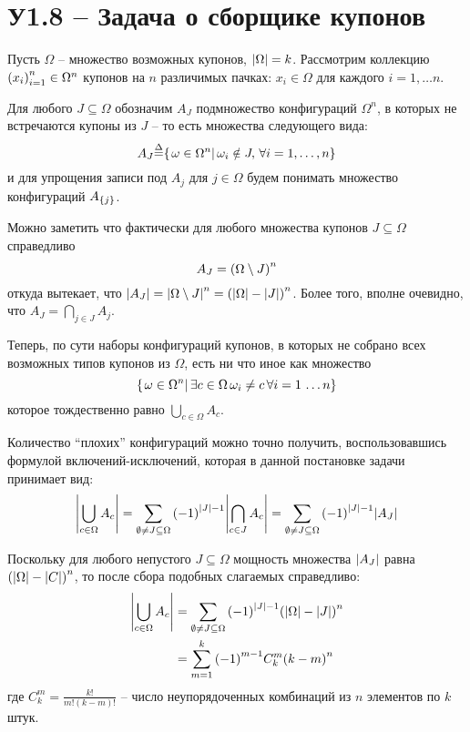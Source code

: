\documentclass[a4paper]{article}
\title{\rus{Домашняя работа по курсу \\ ``Теоретико-вероятностные методы в статистике''}}
\author{\rus{Назаров Иван,} \rus{101мНОД(ИССА)}}
\let\originalleft\left
\let\originalright\right
\renewcommand{\left}{\mathopen{}\mathclose\bgroup\originalleft}
\renewcommand{\right}{\aftergroup\egroup\originalright}
\newcommand{\obj}[1]{{\left\{ #1 \right \}}}
\newcommand{\brac}[1]{{\left ( #1 \right )}}
\newcommand{\induc}[1]{{\left . #1 \right \vert}}
\newcommand{\abs}[1]{{\left | #1 \right |}}
\newcommand{\defn}{{\mathop{\overset{\Delta}{=}}\nolimits}}
\begin{document}
\maketitle

\section{У1.8 -- Задача о сборщике купонов} %
\label{sec:task_1_8}

Пусть $\Omega$ -- множество возможных купонов, $\abs{\Omega} = k$.
Рассмотрим коллекцию $\brac{x_i}_{i=1}^n\in \Omega^n$ купонов на $n$
различимых пачках: $x_i\in \Omega$ для каждого $i=1,\ldots n$.

Для любого $J\subseteq \Omega$ обозначим $A_J$ подмножество
конфигураций $\Omega^n$, в которых не встречаются купоны из $J$ --
то есть множества следующего вида:
\[A_J \defn \obj{ \induc{ \omega\in \Omega^n }\, \omega_i \notin J,\, \forall i = 1,\ldots,n }\]
и для упрощения записи под $A_j$ для $j\in \Omega$ будем понимать
множество конфигураций $A_{\obj{j}}$.

Можно заметить что фактически для любого множества купонов
$J\subseteq \Omega$ справедливо \[A_J = \brac{\Omega\setminus J}^n\]
откуда вытекает, что $\abs{A_J} = \abs{\Omega\setminus J}^n = \brac{\abs{\Omega} - \abs{J}}^n$.
Более того, вполне очевидно, что $A_J = \bigcap_{j\in J} A_j$.

Теперь, по сути наборы конфигураций купонов, в которых не собрано
всех возможных типов купонов из $\Omega$, есть ни что иное как
множество
\[\obj{ \induc{ \omega\in \Omega^n }\,\exists c\in \Omega\, \omega_i \neq c\, \forall i=1\,\ldots n}\]
которое тождественно равно $\bigcup_{c\in \Omega} A_c$.

Количество ``плохих'' конфигураций можно точно получить,
воспользовавшись формулой включений-исключений, которая в данной
постановке задачи принимает вид:
\[\abs{ \bigcup_{c\in \Omega} A_c }
= \sum_{\emptyset \neq J\subseteq \Omega}
\brac{-1}^{\abs{J} - 1} \abs{\bigcap_{c\in J} A_c}
= \sum_{\emptyset \neq J\subseteq \Omega}
\brac{-1}^{\abs{J} - 1} \abs{A_J} \]

Поскольку для любого непустого $J\subseteq \Omega$ мощность
множества $\abs{A_J}$ равна $\brac{\abs{\Omega} - \abs{C}}^n$, то
после сбора подобных слагаемых справедливо:
\begin{align*}
	\abs{ \bigcup_{c\in \Omega} A_c }
	&= \sum_{\emptyset \neq J\subseteq \Omega}
		\brac{-1}^{\abs{J} - 1} \brac{\abs{\Omega} - \abs{J}}^n \\
	&= \sum_{m=1}^k \brac{-1}^{m-1} C^m_k \brac{k - m}^n
\end{align*}
где $C^m_k = \frac{k!}{m!(k-m)!}$ -- число неупорядоченных
комбинаций из $n$ элементов по $k$ штук.
\end{document}
